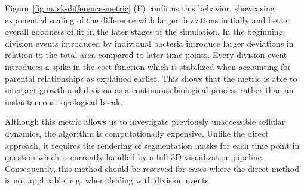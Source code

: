 \documentclass[10pt,letterpaper]{article}
\begin{document}
Figure~\ref{fig:mask-difference-metric} (F) confirms this behavior, showcasing exponential scaling
of the difference with larger deviations initially and better overall goodness of fit in the later
stages of the simulation.
In the beginning, division events introduced by individual bacteria introduce larger deviations in
relation to the total area compared to later time points.
Every division event introduces a spike in the cost function which is stabilized when accounting
for parental relationships as explained earlier.
This shows that the metric is able to interpret growth and division as a continuous biological
process rather than an instantaneous topological break.

Although this metric allows us to investigate previously unaccessible cellular dynamics, the
algorithm is computationally expensive.
Unlike the direct approach, it requires the rendering of segmentation masks for each time point in
question which is currently handled by a full 3D visualization pipeline.
Consequently, this method should be reserved for cases where the direct method is not applicable,
e.g. when dealing with division events.
\end{document}
